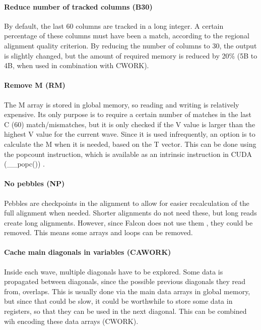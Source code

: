\documentclass[../main/thesis.tex]{subfiles}
\begin{document}

\paragraph{Reduce number of tracked columns (B30)}
By default, the last 60 columns are tracked in a long integer.
A certain percentage of these columns must have been a match, according to the regional alignment quality criterion.
By reducing the number of columns to 30, the output is slightly changed, but the amount of required memory is reduced by 20\% (5B to 4B, when used in combination with CWORK).

\paragraph{Remove M (RM)}
The M array is stored in global memory, so reading and writing is relatively expensive.
Its only purpose is to require a certain number of matches in the last C (60) match/mismatches, but it is only checked if the V value is larger than the highest V value for the current wave.
Since it is used infrequently, an option is to calculate the M when it is needed, based on the T vector.
This can be done using the popcount instruction, which is available as an intrinsic instruction in CUDA (\_\_popc()) \cite{CUDA_math}. 

\paragraph{No pebbles (NP)}
Pebbles are checkpoints in the alignment to allow for easier recalculation of the full alignment when needed.
Shorter alignments do not need these, but long reads create long alignments.
However, since Falcon does not use them \cite{Falcon}, they could be removed.
This means some arrays and loops can be removed.

\paragraph{Cache main diagonals in variables (CAWORK)}
Inside each wave, multiple diagonals have to be explored.
Some data is propagated between diagonals, since the possible previous diagonals they read from, overlaps.
This is usually done via the main data arrays in global memory, but since that could be slow, it could be worthwhile to store some data in registers, so that they can be used in the next diagonal.
This can be combined wih encoding these data arrays (CWORK).
\end{document}
